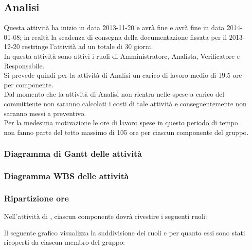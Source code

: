 \subsection{Analisi}
Questa attività ha inizio in data 2013-11-20 e avrà fine e avrà fine in data 2014-01-08; in realtà la scadenza di consegna della documentazione fissata per il 2013-12-20 restringe l'attività ad un totale di 30 giorni.\\
In questa attività sono attivi i ruoli di Amministratore, Analista, Verificatore e Responsabile.\\
Si prevede quindi per la attività di Analisi un carico di lavoro medio di 19.5 ore per componente.\\
Dal momento che la attività di Analisi non rientra nelle spese a carico del committente non saranno calcolati i costi di tale attività e conseguentemente non saranno messi a preventivo.\\
Per la medesima motivazione le ore di lavoro spese in questo periodo di tempo non fanno parte del tetto massimo di 105 ore per ciascun componente del gruppo.

\subsubsection{Diagramma di Gantt delle attività}

\newpage
\subsubsection{Diagramma WBS delle attività}

\newpage
\subsubsection{Ripartizione ore}

\newpage
Nell'attività di , ciascun componente dovrà rivestire i seguenti ruoli:

Il seguente grafico visualizza la suddivisione dei ruoli e per quanto essi sono stati ricoperti da ciascun membro del gruppo:
